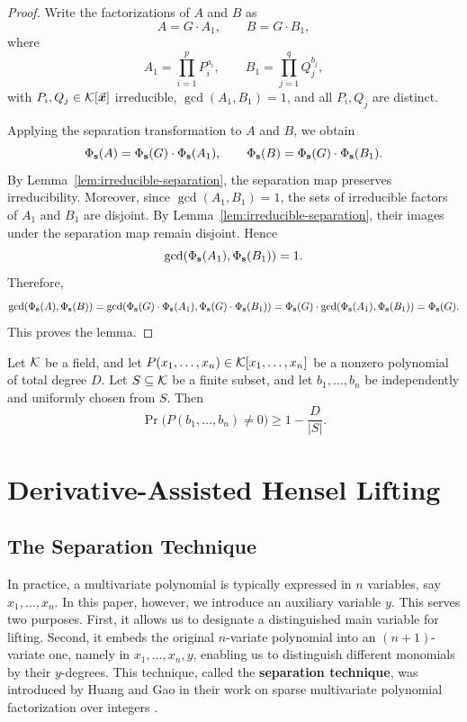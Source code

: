 \documentclass{article}
\numberwithin{equation}{section}
\begin{document}
\begin{proof}
Write the factorizations of $A$ and $B$ as
\[
A = G \cdot A_1, \qquad B = G \cdot B_1,
\]
where
\[
A_1 = \prod_{i=1}^p P_i^{a_i}, \qquad
B_1 = \prod_{j=1}^q Q_j^{b_j},
\]
with $P_i, Q_j\in {\mathcal{K}}[\vec{\boldsymbol{x}}]$ irreducible, $\gcd(A_1, B_1) = 1$, and all $P_i,Q_j$ are distinct.

Applying the separation transformation to $A$ and $B$, we obtain
\[
\Phi_{\mathbf{s}}(A) = \Phi_{\mathbf{s}}(G) \cdot \Phi_{\mathbf{s}}(A_1), \qquad \Phi_{\mathbf{s}}(B) = \Phi_{\mathbf{s}}(G) \cdot \Phi_{\mathbf{s}}(B_1).
\]
By Lemma~\ref{lem:irreducible-separation}, the separation map preserves irreducibility. Moreover, since $\gcd(A_1, B_1) = 1$, the sets of irreducible factors of $A_1$ and $B_1$ are disjoint. By Lemma~\ref{lem:irreducible-separation}, their images under the separation map remain disjoint. Hence
\[
\gcd(\Phi_{\mathbf{s}}(A_1), \Phi_{\mathbf{s}}(B_1)) = 1.
\]
Therefore,
\[
\gcd(\Phi_{\mathbf{s}}(A), \Phi_{\mathbf{s}}(B)) = \gcd(\Phi_{\mathbf{s}}(G) \cdot \Phi_{\mathbf{s}}(A_1), \Phi_{\mathbf{s}}(G) \cdot \Phi_{\mathbf{s}}(B_1))
= \Phi_{\mathbf{s}}(G) \cdot \gcd(\Phi_{\mathbf{s}}(A_1), \Phi_{\mathbf{s}}(B_1))
= \Phi_{\mathbf{s}}(G).
\]
This proves the lemma.
\end{proof}



\begin{theorem}\label{thm:sz}
Let ${\mathcal{K}}$ be a field, and let $P(x_1,\dots,x_n) \in {\mathcal{K}}[x_1,\dots,x_n]$ be a nonzero polynomial of total degree $D$. Let $S \subseteq {\mathcal{K}}$ be a finite subset, and let $b_1,\dots,b_n$ be independently and uniformly chosen from $S$. Then
\[
\Pr\bigl(P(b_1,\dots,b_n) \neq 0\bigr) \ge 1 - \frac{D}{|S|}.
\]
\end{theorem}

\section{Derivative-Assisted Hensel Lifting}\label{sec:lifting}

\subsection{The Separation Technique}\label{sec:separation}

In practice, a multivariate polynomial is typically expressed in $n$ variables, say $x_1,\dots,x_n$. In this paper, however, we introduce an auxiliary variable $y$. This serves two purposes. First, it allows us to designate a distinguished main variable for lifting. Second, it embeds the original $n$-variate polynomial into an $(n+1)$-variate one, namely in $x_1,\dots,x_n,y$, enabling us to distinguish different monomials by their $y$-degrees. This technique, called the \textbf{separation technique}, was introduced by Huang and Gao in their work on sparse multivariate polynomial factorization over integers \cite{HuangGao2023Factorization}.
\end{document}
